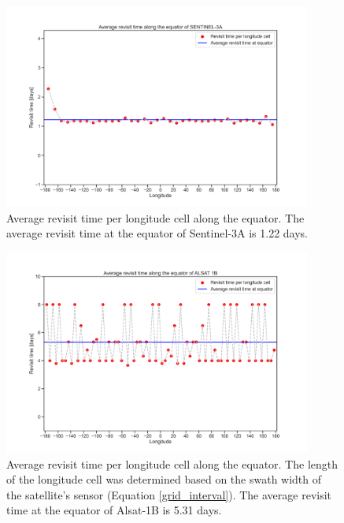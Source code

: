 \begin{figure}
\centering
\includegraphics[width=0.9\textwidth]{Images/revisit_time_of_SENTINEL-3A.png}\caption{Average revisit time per longitude cell along the equator. The average revisit time at the equator of Sentinel-3A is 1.22 days.}
\label{revisit_time_Sentinel3A}
\end{figure}

\begin{figure}
\centering
\includegraphics[width=0.9\textwidth]{Images/revisit_time_of_ALSAT_1B.png}\caption{Average revisit time per longitude cell along the equator. The length of the longitude cell was determined based on the swath width of the satellite's sensor (Equation \ref{grid_interval}). The average revisit time at the equator of Alsat-1B is 5.31 days.}
\label{revisit_time_of_ALSAT 1B}
\end{figure}

